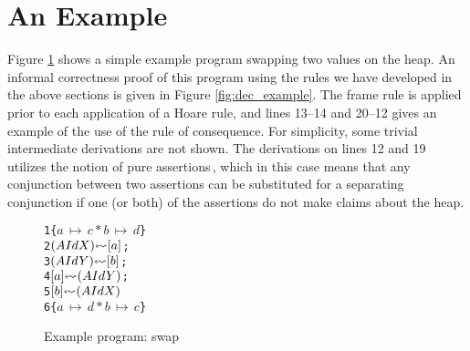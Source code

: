 \section{An Example}
\label{sec:ex}
Figure \ref{fig:example} shows a simple example program swapping two values on the heap. An informal correctness proof of this program using the rules we have developed in the above sections is given in Figure \ref{fig:dec_example}. The frame rule is applied prior to each application of a Hoare rule, and lines 13--14 and 20--12 gives an example of the use of the rule of consequence. For simplicity, some trivial intermediate derivations are not shown. The derivations on lines 12 and 19 utilizes the notion of pure assertions\,\cite{reynolds2008AnIntroductionTo}, which in this case means that any conjunction between two assertions can be substituted for a separating conjunction if one (or both) of the assertions do not make claims about the heap.
\begin{figure}
\begin{alltt}
                        1  \{\( a\,\mapsto\,c * b\,\mapsto\,d \)\}
                        2     \((AId X) \lsquigarr [ a ]\);
                        3     \((AId Y) \lsquigarr [ b ]\);
                        4     \([ a ] \lsquigarr (AId Y)\);
                        5     \([ b ] \lsquigarr (AId X)\)
                        6  \{\({ a\,\mapsto\,d * b\,\mapsto\,c }\)\}
\end{alltt}
\caption{Example program: swap}
\label{fig:example}
\end{figure}

